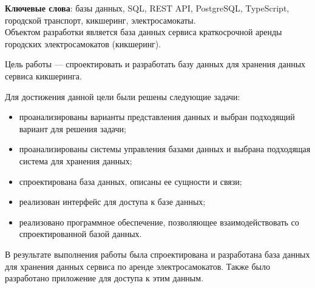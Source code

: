 \begin{essay}{}
	\noindent\textbf{Ключевые слова}: базы данных, SQL, REST API, PostgreSQL, TypeScript, городской транспорт, кикшеринг, электросамокаты.\\

	Объектом разработки является база данных сервиса краткосрочной аренды городских электросамокатов (кикшеринг).

	Цель работы --- спроектировать и разработать базу данных для хранения данных сервиса кикшеринга.

	Для достижения данной цели были решены следующие задачи:

	\begin{itemize}
		\item проанализированы варианты представления данных и выбран подходящий вариант для решения задачи;
		\item проанализированы системы управления базами данных и выбрана подходящая система для хранения данных;
		\item спроектирована база данных, описаны ее сущности и связи;
		\item реализован интерфейс для доступа к базе данных;
		\item реализовано программное обеспечение, позволяющее взаимодействовать со спроектированной базой данных.
	\end{itemize}

	В результате выполнения работы была спроектирована и разработана база данных для хранения данных сервиса по аренде электросамокатов. Также было разработано приложение для доступа к этим данным.
\end{essay}
